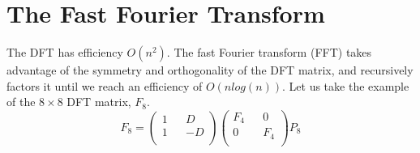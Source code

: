 \documentclass[11pt]{article}
\begin{document}
\section{The Fast Fourier Transform}
The DFT has efficiency $O(n^2)$. The fast Fourier transform (FFT) takes advantage of the symmetry and orthogonality of the DFT matrix, and recursively factors it until we reach an efficiency of $O(nlog(n)).$
Let us take the example of the $8\times8$ DFT matrix, $F_8$.
$$F_8=\begin{pmatrix}
  1 && D\\
  1 && -D\\
 \end{pmatrix}
 \begin{pmatrix}
  F_4 && 0\\
  0 && F_4\\
 \end{pmatrix}
 P_8
$$
\end{document}
